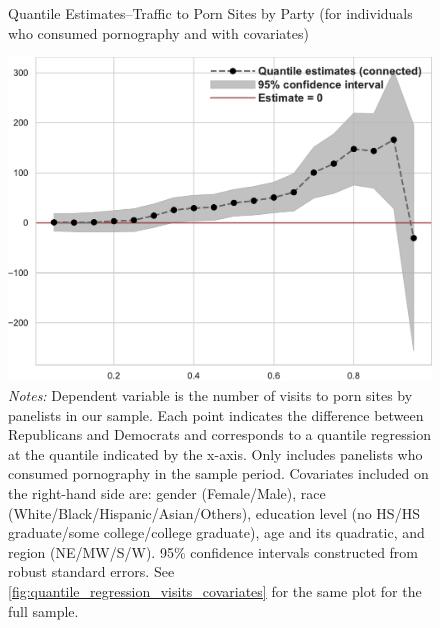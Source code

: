 \documentclass[12pt, letterpaper]{article}
\begin{document}
\begin{figure}
	\centering
	\caption{Quantile Estimates--Traffic to Porn Sites by Party (for individuals who consumed pornography and with covariates)}
	\includegraphics[width=.55\linewidth]{../figs/quantile_reg_nonzero_covariates_visits_adult.pdf}
	\caption*{\footnotesize \emph{Notes:} 
		Dependent variable is the number of visits to porn sites by panelists in our sample.
		Each point indicates the difference between Republicans and Democrats and corresponds to a quantile regression at the quantile indicated by the x-axis.
		Only includes panelists who consumed pornography in the sample period.
		Covariates included on the right-hand side are: gender (Female/Male), race (White/Black/Hispanic/Asian/Others), education level (no HS/HS graduate/some college/college graduate), age and its quadratic, and region (NE/MW/S/W).
		95\% confidence intervals constructed from robust standard errors.
		See \cref{fig:quantile_regression_visits_covariates} for the same plot for the full sample.
	}
	\label{fig:quantile_regression_visits_nonzeroes_covariates}
\end{figure}
\end{document}
